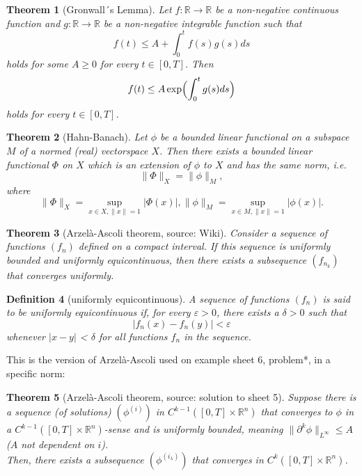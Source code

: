 \documentclass[12pt,a4paper]{article}
\newtheorem{definition}{Definition}
\newtheorem{thm}[definition]{Theorem}
\begin{document}
\begin{thm}[Gronwall´s Lemma]
Let $f:\mathbb{R}\rightarrow\mathbb{R}$ be a non-negative continuous function and $g:\mathbb{R}\rightarrow\mathbb{R}$ be a  non-negative integrable function such that
\begin{equation}
f(t)\leq A+\int_0^tf(s)g(s)ds
\end{equation}
holds for some $A\geq 0$ for every $t\in[0,T]$. Then
\begin{equation}
f(t)\leq A\exp\Bigl(\int_0^t g(s) ds\Bigr)
\end{equation}
holds for every $t\in[0,T]$.
\end{thm}

\begin{thm}[Hahn-Banach]
Let $\phi$ be a bounded linear functional on a subspace $M$ of a normed (real) vectorspace $X$. Then there exists a bounded linear functional $\Phi$ on $X$ which is an extension of $\phi$ to $X$ and has the same norm, i.e.
\begin{equation}
\lVert\Phi\rVert_X=\lVert \phi \rVert_M,
\end{equation}
where
\begin{equation}
\lVert\Phi\rVert_X=\sup_{x\in X,\lVert x\rVert=1} \vert\Phi(x)\vert, 
\lVert \phi \rVert_M = \sup_{x\in M,\lVert x\rVert=1} \vert\phi(x)\vert.
\end{equation}
\end{thm}

\begin{thm}[Arzelà-Ascoli theorem, source: Wiki]
Consider a sequence of functions $(f_n)$ defined on a compact interval. If this sequence is uniformly bounded and uniformly equicontinuous, then there exists a subsequence $(f_{n_k})$ that converges uniformly.
\end{thm}

\begin{definition}[uniformly equicontinuous]
A sequence of functions $(f_n)$ is said to be uniformly equicontinuous if, for every $\varepsilon > 0$, there exists a $\delta > 0$ such that
\begin{equation}
\left|f_{n}(x)-f_{n}(y)\right|<\varepsilon
\end{equation}
whenever $| x-y |$ < $\delta$ for all functions $f_n$ in the sequence.
\end{definition}

This is the version of Arzelà-Ascoli used on example sheet 6, problem*, in a specific norm:

\begin{thm}[Arzelà-Ascoli theorem, source: solution to sheet 5]
Suppose there is a sequence (of solutions) $(\phi^{(i)})$ in $C^{k-1}([0,T]\times \mathbb{R}^n)$ that converges to $\phi$ in a $C^{k-1}([0,T]\times \mathbb{R}^n)$-sense and is uniformly bounded, meaning $\lVert \partial ^k \phi \rVert _{L^{\infty}} \leq A$ ($A$ not dependent on $i$).\\
Then, there exists a subsequence $(\phi^{(i_{\lambda})})$ that converges in $C^{k}([0,T]\times \mathbb{R}^n)$.
\end{thm}
\end{document}
